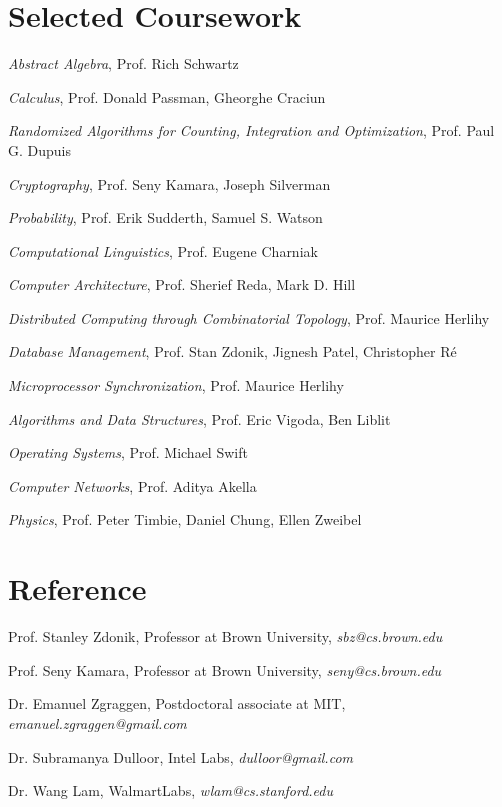 \documentclass[letterpaper]{article}
\renewenvironment{itemize}{
  \begin{list}{}{
    \setlength{\leftmargin}{1.5em}
  }
}{
  \end{list}
}
\begin{document}
\section*{Selected Coursework}
\begin{itemize}
\item \textit{Abstract Algebra}, Prof. Rich Schwartz
\item \textit{Calculus}, Prof. Donald Passman, Gheorghe Craciun
\item \textit{Randomized Algorithms for Counting, Integration and Optimization}, Prof. Paul G. Dupuis
\item \textit{Cryptography}, Prof. Seny Kamara, Joseph Silverman
\item \textit{Probability}, Prof. Erik Sudderth, Samuel S. Watson 
\item \textit{Computational Linguistics}, Prof. Eugene Charniak
\item \textit{Computer Architecture}, Prof. Sherief Reda, Mark D. Hill
\item \textit{Distributed Computing through Combinatorial Topology}, Prof. Maurice Herlihy
\item \textit{Database Management}, Prof. Stan Zdonik, Jignesh Patel, Christopher R\'e
\item \textit{Microprocessor Synchronization}, Prof. Maurice Herlihy
\item \textit{Algorithms and Data Structures}, Prof. Eric Vigoda, Ben Liblit
\item \textit{Operating Systems}, Prof. Michael Swift
\item \textit{Computer Networks}, Prof. Aditya Akella
\item \textit{Physics}, Prof. Peter Timbie, Daniel Chung, Ellen Zweibel
\end{itemize}

\section*{Reference}
\begin{itemize}

\item Prof. Stanley Zdonik, Professor at Brown University, \textit{sbz@cs.brown.edu}
\item Prof. Seny Kamara, Professor at Brown University, \textit{seny@cs.brown.edu}
\item Dr. Emanuel Zgraggen, Postdoctoral associate at MIT, \textit{emanuel.zgraggen@gmail.com}
\item Dr. Subramanya Dulloor, Intel Labs, \textit{dulloor@gmail.com}
\item Dr. Wang Lam, WalmartLabs, \textit{wlam@cs.stanford.edu}

\end{itemize}

\bigskip
\end{document}
